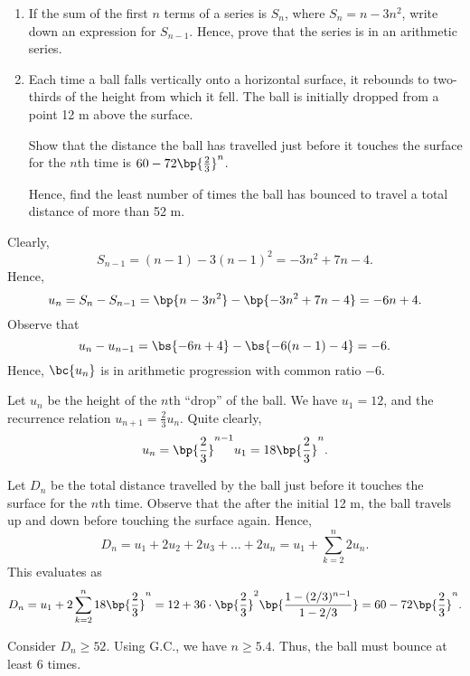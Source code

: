 \begin{problem}
    \begin{enumerate}
        \item If the sum of the first $n$ terms of a series is $S_n$, where $S_n = n - 3n^2$, write down an expression for $S_{n-1}$. Hence, prove that the series is in an arithmetic series.
        \item Each time a ball falls vertically onto a horizontal surface, it rebounds to two-thirds of the height from which it fell. The ball is initially dropped from a point 12 m above the surface.
        
        Show that the distance the ball has travelled just before it touches the surface for the $n$th time is $60 - 72 \bp{\frac23}^n$.

        Hence, find the least number of times the ball has bounced to travel a total distance of more than 52 m.
    \end{enumerate}
\end{problem}
\begin{solution}
    \begin{ppart}
        Clearly, \[S_{n-1} = (n-1) - 3(n-1)^2 = -3n^2 + 7n - 4.\] Hence, \[u_n = S_n - S_{n-1} = \bp{n - 3n^2} - \bp{-3n^2 + 7n - 4} = -6n + 4.\] Observe that \[u_n - u_{n-1} = \bs{-6n+4} - \bs{-6(n-1) - 4} = -6.\] Hence, $\bc{u_n}$ is in arithmetic progression with common ratio $-6$.
    \end{ppart}
    \begin{ppart}
        Let $u_n$ be the height of the $n$th ``drop'' of the ball. We have $u_1 = 12$, and the recurrence relation $u_{n+1} = \frac23 u_n$. Quite clearly, \[u_n = \bp{\frac23}^{n-1} u_1 = 18 \bp{\frac23}^n.\]
        
        Let $D_n$ be the total distance travelled by the ball just before it touches the surface for the $n$th time. Observe that the after the initial 12 m, the ball travels up and down before touching the surface again. Hence, \[D_n = u_1 + 2 u_2 + 2u_3 + \dots + 2u_n = u_1 + \sum_{k = 2}^n 2u_n.\] This evaluates as \[D_n = u_1 + 2 \sum_{k=2}^n 18 \bp{\frac23}^n = 12 + 36 \cdot \bp{\frac23}^2 \bp{\frac{1 - (2/3)^{n-1}}{1 - 2/3}} = 60 - 72 \bp{\frac23}^n.\]

        Consider $D_n \geq 52$. Using G.C., we have $n \geq 5.4$. Thus, the ball must bounce at least 6 times.
    \end{ppart}
\end{solution}

